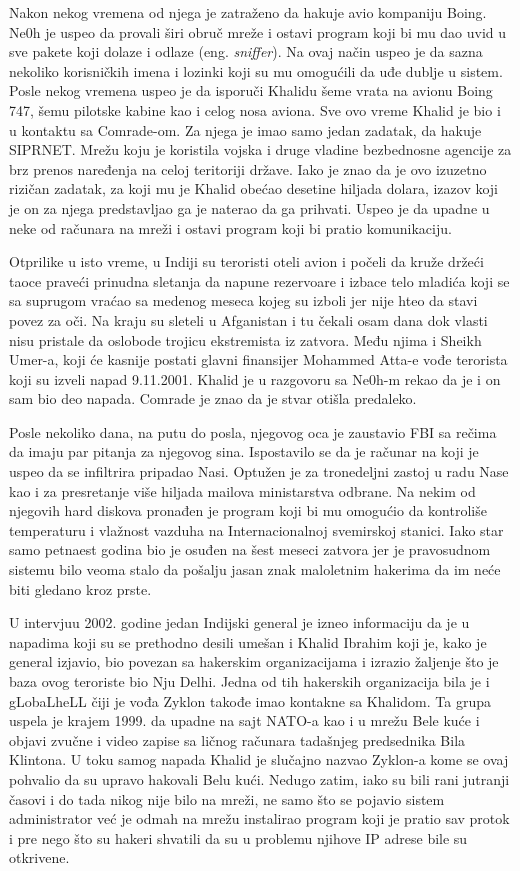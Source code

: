 \documentclass[a4paper]{article}
\begin{document}
Nakon nekog vremena od njega je zatraženo da hakuje avio kompaniju Boing. Ne0h je uspeo da provali širi obruč mreže i ostavi program koji bi mu dao uvid u sve pakete koji dolaze i odlaze (eng. \textit{sniffer}). Na ovaj način uspeo je da sazna nekoliko korisničkih imena i lozinki koji su mu omogućili da uđe dublje u sistem. Posle nekog vremena uspeo je da isporuči Khalidu šeme vrata na avionu Boing 747, šemu pilotske kabine kao i celog nosa aviona. Sve ovo vreme Khalid je bio i u kontaktu sa Comrade-om. Za njega je imao samo jedan zadatak, da hakuje SIPRNET. Mrežu koju je koristila vojska i druge vladine bezbednosne agencije za brz prenos naređenja na celoj teritoriji države. Iako je znao da je ovo izuzetno rizičan zadatak, za koji mu je Khalid obećao desetine hiljada dolara, izazov koji je on za njega predstavljao ga je naterao da ga prihvati. Uspeo je da upadne u neke od računara na mreži i ostavi program koji bi pratio komunikaciju.

Otprilike u isto vreme, u Indiji su teroristi oteli avion i počeli da kruže držeći taoce praveći prinudna sletanja da napune rezervoare i izbace telo mladića koji se sa suprugom vraćao sa medenog meseca kojeg su izboli jer nije hteo da stavi povez za oči. Na kraju su sleteli u Afganistan i tu čekali osam dana dok vlasti nisu pristale da oslobode trojicu ekstremista iz zatvora. Među njima i Sheikh Umer-a, koji će kasnije postati glavni finansijer Mohammed Atta-e vođe terorista koji su izveli napad 9.11.2001. Khalid je u razgovoru sa Ne0h-m rekao da je i on sam bio deo napada. Comrade je znao da je stvar otišla predaleko.

Posle nekoliko dana, na putu do posla, njegovog oca je zaustavio FBI sa rečima da imaju par pitanja za njegovog sina. Ispostavilo se da je računar na koji je uspeo da se infiltrira pripadao Nasi. Optužen je za tronedeljni zastoj u radu Nase kao i za presretanje više hiljada mailova ministarstva odbrane. Na nekim od njegovih hard diskova pronađen je program koji bi mu omogućio da kontroliše temperaturu i vlažnost vazduha na Internacionalnoj svemirskoj stanici. Iako star samo petnaest godina bio je osuđen na šest meseci zatvora jer je pravosudnom sistemu bilo veoma stalo da pošalju jasan znak maloletnim hakerima da im neće biti gledano kroz prste. 

U intervjuu 2002. godine jedan Indijski general je izneo informaciju da je u napadima koji su se prethodno desili umešan i Khalid Ibrahim koji je, kako je general izjavio, bio povezan sa hakerskim organizacijama i izrazio žaljenje što je baza ovog teroriste bio Nju Delhi. Jedna od tih hakerskih organizacija bila je i gLobaLheLL čiji je vođa Zyklon takođe imao kontakne sa Khalidom. Ta grupa uspela je krajem 1999. da upadne na sajt NATO-a kao i u mrežu Bele kuće i objavi zvučne i video zapise sa ličnog računara tadašnjeg predsednika Bila Klintona. U toku samog napada Khalid je slučajno nazvao Zyklon-a kome se ovaj pohvalio da su upravo hakovali Belu kući. Nedugo zatim, iako su bili rani jutranji časovi i do tada nikog nije bilo na mreži, ne samo što se pojavio sistem administrator već je odmah na mrežu instalirao program koji je pratio sav protok i pre nego što su hakeri shvatili da su u problemu njihove IP adrese bile su otkrivene.
\end{document}
